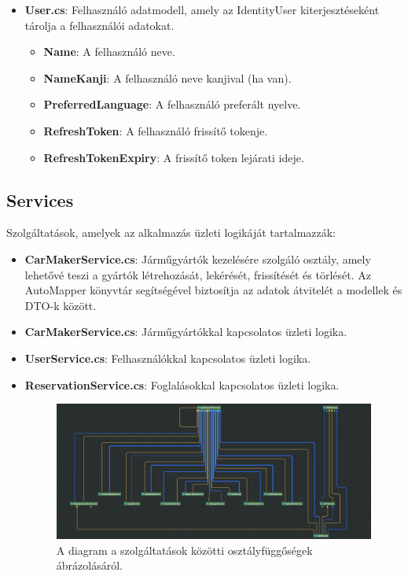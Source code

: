 \documentclass{report}[11pt]
\begin{document}
\begin{itemize}
\item \textbf{User.cs}: Felhasználó adatmodell, amely az IdentityUser kiterjesztéseként tárolja a felhasználói adatokat.
\begin{itemize}
    \item \textbf{Name}: A felhasználó neve.
    \item \textbf{NameKanji}: A felhasználó neve kanjival (ha van).
    \item \textbf{PreferredLanguage}: A felhasználó preferált nyelve.
    \item \textbf{RefreshToken}: A felhasználó frissítő tokenje.
    \item \textbf{RefreshTokenExpiry}: A frissítő token lejárati ideje.
\end{itemize}
\end{itemize}

\subsection{Services}
Szolgáltatások, amelyek az alkalmazás üzleti logikáját tartalmazzák:

\begin{itemize}
    \item \textbf{CarMakerService.cs}: Járműgyártók kezelésére szolgáló osztály, amely lehetővé teszi a gyártók létrehozását, lekérését, frissítését és törlését. Az AutoMapper könyvtár segítségével biztosítja az adatok átvitelét a modellek és DTO-k között. 
    \item \textbf{CarMakerService.cs}: Járműgyártókkal kapcsolatos üzleti logika.
    \item \textbf{UserService.cs}: Felhasználókkal kapcsolatos üzleti logika.
    \item \textbf{ReservationService.cs}: Foglalásokkal kapcsolatos üzleti logika.
    \begin{figure}[h!]
        \centering
        \includegraphics[width=\textwidth]{figures/class_dependencies.png} 
        \caption{A diagram a szolgáltatások közötti osztályfüggőségek ábrázolásáról.}
        \label{fig:classDependencies}
    \end{figure}    
\end{itemize}
\end{document}
